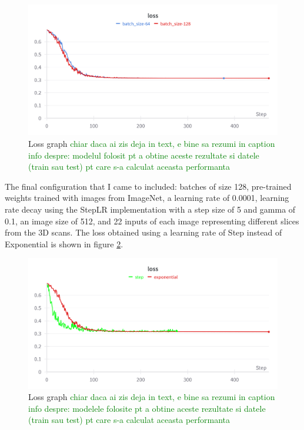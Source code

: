 \begin{figure}[!ht]
    \centering
    \includegraphics[width=1\linewidth]{figures/Figure22.png}
    \caption{Loss graph
    \textcolor{green}{chiar daca ai zis deja in text, e bine sa rezumi in caption info despre: modelul folosit pt a obtine aceste rezultate si datele (train sau test) pt care s-a calculat aceasta performanta}}
    \label{fig:fig21}
\end{figure}

The final configuration that I came to included: batches of size 128, pre-trained weights trained with images from ImageNet, a learning rate of 0.0001, learning rate decay using the StepLR implementation with a step size of 5 and gamma of 0.1, an image size of 512, and 22 inputs of each image representing different slices from the 3D scans. The loss obtained using a learning rate of Step instead of Exponential is shown in figure \ref{fig:fig22}.

\begin{figure}[!ht]
    \centering
    \includegraphics[width=1\linewidth]{figures/Figure24.png}
    \caption{Loss graph
    \textcolor{green}{chiar daca ai zis deja in text, e bine sa rezumi in caption info despre: modelele folosite pt a obtine aceste rezultate si datele (train sau test) pt care s-a calculat aceasta performanta}
    }
    \label{fig:fig22}
\end{figure}

